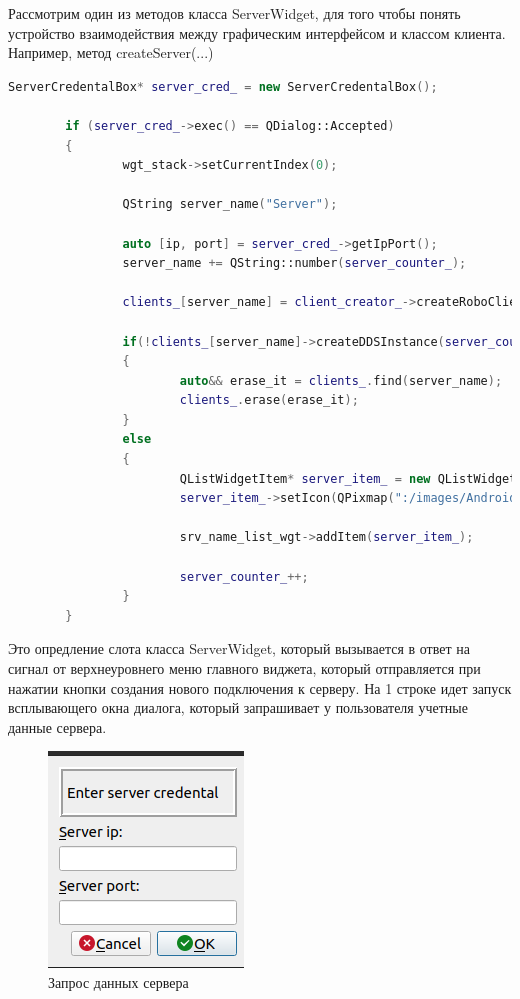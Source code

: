 \documentclass[a4paper, 14pt]{extreport}
\begin{document}
\par Рассмотрим один из методов класса ServerWidget, для того чтобы понять устройство взаимодействия между графическим интерфейсом и 
классом клиента. Например, метод createServer(...)
\begin{lstlisting}[language=C++, frame=single, xleftmargin=15pt, caption={Определение слота createServer},label=DescriptiveLabel]
        ServerCredentalBox* server_cred_ = new ServerCredentalBox();

        if (server_cred_->exec() == QDialog::Accepted)
        {
                wgt_stack->setCurrentIndex(0);
        
                QString server_name("Server");
        
                auto [ip, port] = server_cred_->getIpPort();
                server_name += QString::number(server_counter_);
        
                clients_[server_name] = client_creator_->createRoboClient(ip, port);
        
                if(!clients_[server_name]->createDDSInstance(server_counter_))
                {
                        auto&& erase_it = clients_.find(server_name);
                        clients_.erase(erase_it);
                }
                else
                {
                        QListWidgetItem* server_item_ = new QListWidgetItem(server_name);
                        server_item_->setIcon(QPixmap(":/images/Android.png"));
                
                        srv_name_list_wgt->addItem(server_item_);
                
                        server_counter_++;
                }
        }
\end{lstlisting}
\par Это опредление слота класса ServerWidget, который вызывается в ответ на сигнал от верхнеуровнего меню главного виджета, который 
отправляется при нажатии кнопки создания нового подключения к серверу. На 1 строке идет запуск всплывающего окна диалога, который 
запрашивает у пользователя учетные данные сервера.
\begin{figure}[ht]
\begin{center}
\includegraphics[scale = 0.4]{./figure/cred_dialog}
\caption{Запрос данных сервера}
\label{fig:manip_photo}
\end{center}
\end{figure}
\end{document}
